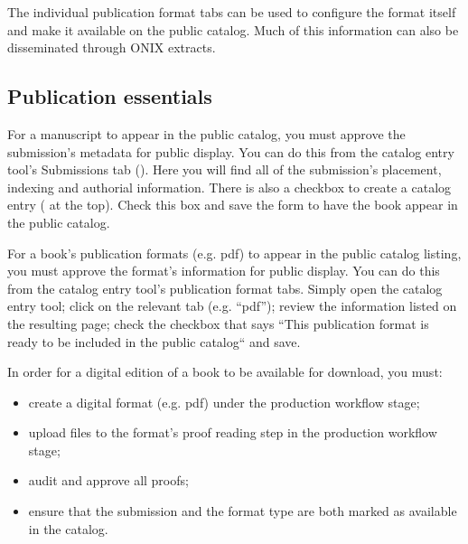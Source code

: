 The individual publication format tabs can be used to configure the format itself and make it available on the public catalog. Much of this information can also be disseminated through ONIX extracts.

\subsection*{Publication essentials}

For a manuscript to appear in the public catalog, you must approve the submission's metadata for public display. You can do this from the catalog entry tool's Submissions tab (). Here you will find all of the submission's placement, indexing and authorial information. There is also a checkbox to create a catalog entry ( at the top). Check this box and save the form to have the book appear in the public catalog.

For a book's publication formats (e.g. pdf) to appear in the public catalog listing, you must approve the format's information for public display. You can do this from the catalog entry tool's publication format tabs. Simply open the catalog entry tool; click on the relevant tab (e.g. ``pdf''); review the information listed on the resulting page; check the checkbox that says ``This publication format is ready to be included in the public catalog`` and save.

In order for a digital edition of a book to be available for download, you must:
\begin{itemize}[noitemsep]
\item create a digital format (e.g. pdf) under the production workflow stage;
\item upload files to the format's proof reading step in the production workflow stage;
\item audit and approve all proofs;
\item ensure that the submission and the format type are both marked as available in the catalog.
\end{itemize}



